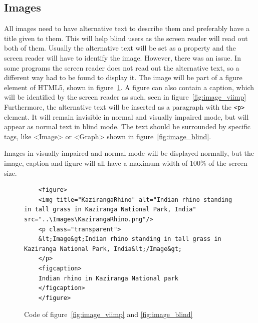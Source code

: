 \subsection{Images}

All images need to have alternative text to describe them and preferably have a title given to them. This will help blind users as the screen reader will read out both of them. Usually the alternative text will be set as a property and the screen reader will have to identify the image. However, there was an issue. In some programs the screen reader does not read out the alternative text, so a different way had to be found to display it. The image will be part of a figure element of HTML5, shown in figure~\ref{fig:image_code}. A figure can also contain a caption, which will be identified by the screen reader as such, seen in  figure~\ref{fig:image_viimp} Furthermore, the alternative text will be inserted as a paragraph with the \lstinline|<p>| element. It will remain invisible in normal and visually impaired mode, but will appear as normal text in blind mode. The text should be surrounded by specific tags, like <Image> or <Graph> shown in figure~\ref{fig:image_blind}.

Images in visually impaired and normal mode will be displayed normally, but the image, caption and figure will all have a maximum width of 100\% of the screen size.


\begin{figure}[H]
	\lstset{language=HTML}
	\begin{lstlisting}
	<figure>
	<img title="KazirangaRhino" alt="Indian rhino standing in tall grass in Kaziranga National Park, India" src="..\Images\KazirangaRhino.png"/>
	<p class="transparent">
	&lt;Image&gt;Indian rhino standing in tall grass in Kaziranga National Park, India&lt;/Image&gt;
	</p>
	<figcaption> 
	Indian rhino in Kaziranga National park
	</figcaption>
	</figure>
	\end{lstlisting}
	\caption{Code of figure~\ref{fig:image_viimp} and \ref{fig:image_blind}}
	\label{fig:image_code}
\end{figure}

